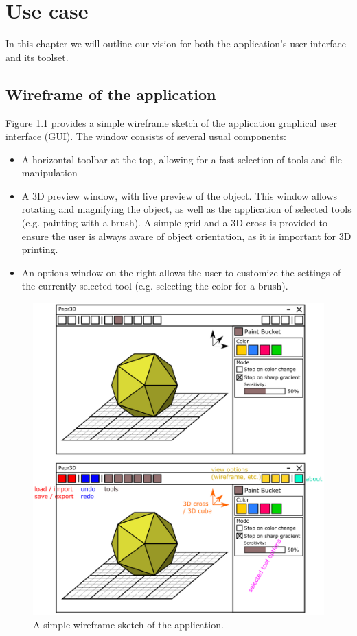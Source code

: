 \chapter{Use case}

In this chapter we will outline our vision for both the application's user interface and its toolset.

\section{Wireframe of the application}\label{sec:wireframe}

Figure \ref{fig:wireframe} provides a simple wireframe sketch of the application graphical user interface (GUI). The window consists of several usual components:
\begin{itemize}
\item A horizontal toolbar at the top, allowing for a fast selection of tools and file manipulation
\item A 3D preview window, with live preview of the object. This window allows rotating and magnifying the object, as well as the application of selected tools (e.g. painting with a brush). A simple grid and a 3D cross is provided to ensure the user is always aware of object orientation, as it is important for 3D printing.
\item An options window on the right allows the user to customize the settings of the currently selected tool (e.g. selecting the color for a brush).
\end{itemize}

\hspace{-30pt}
\begin{figure}
	\centering
	\includegraphics[scale=0.35]{images/wireframe.png}
	\caption{A simple wireframe sketch of the application.}
	\label{fig:wireframe}
\end{figure}

